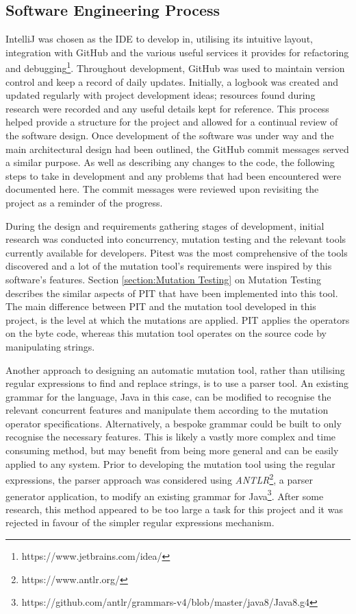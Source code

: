 \documentclass[a4paper,12pt]{article}
\begin{document}
\subsection{Software Engineering Process}

IntelliJ was chosen as the IDE to develop in, utilising its intuitive layout, integration with GitHub and the various useful services it provides for refactoring and debugging\footnote{https://www.jetbrains.com/idea/}. Throughout development, GitHub was used to maintain version control and keep a record of daily updates. Initially, a logbook was created and updated regularly with project development ideas; resources found during research were recorded and any useful details kept for reference. This process helped provide a structure for the project and allowed for a continual review of the software design. Once development of the software was under way and the main architectural design had been outlined, the GitHub commit messages served a similar purpose. As well as describing any changes to the code, the following steps to take in development and any problems that had been encountered were documented here. The commit messages were reviewed upon revisiting the project as a reminder of the progress.    

During the design and requirements gathering stages of development, initial research was conducted into concurrency, mutation testing and the relevant tools currently available for developers. Pitest was the most comprehensive of the tools discovered and a lot of the mutation tool's requirements were inspired by this software's features. Section \ref{section:Mutation Testing} on Mutation Testing describes the similar aspects of PIT that have been implemented into this tool. The main difference between PIT and the mutation tool developed in this project, is the level at which the mutations are applied. PIT applies the operators on the byte code, whereas this mutation tool operates on the source code by manipulating strings.  

Another approach to designing an automatic mutation tool, rather than utilising regular expressions to find and replace strings, is to use a parser tool. An existing grammar for the language, Java in this case, can be modified to recognise the relevant concurrent features and manipulate them according to the mutation operator specifications. Alternatively, a bespoke grammar could be built to only recognise the necessary features. This is likely a vastly more complex and time consuming method, but may benefit from being more general and can be easily applied to any system. Prior to developing the mutation tool using the regular expressions, the parser approach was considered using \textit{ANTLR}\footnote{https://www.antlr.org/}, a parser generator application, to modify an existing grammar for Java\footnote{https://github.com/antlr/grammars-v4/blob/master/java8/Java8.g4}. After some research, this method appeared to be too large a task for this project and it was rejected in favour of the simpler regular expressions mechanism.
\end{document}

